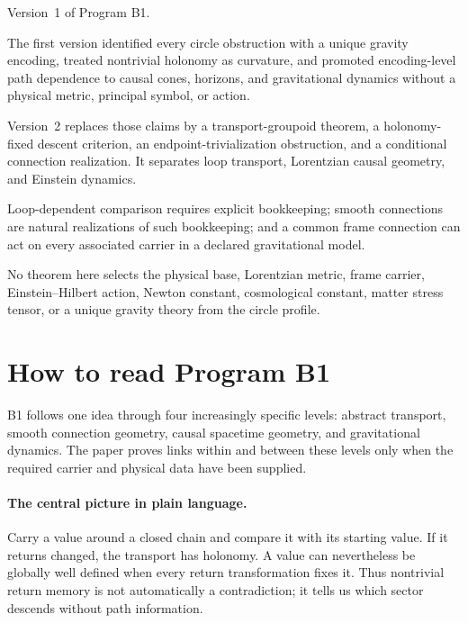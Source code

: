 \documentclass[11pt]{article}
\begin{document}
\begin{description}[leftmargin=2.5cm,style=nextline]
\item[Supersedes.]
Version~1 of Program B1.

\item[Reason.]
The first version identified every circle obstruction with a unique
gravity encoding, treated nontrivial holonomy as curvature, and promoted
encoding-level path dependence to causal cones, horizons, and gravitational
dynamics without a physical metric, principal symbol, or action.

\item[Resolution.]
Version~2 replaces those claims by a transport-groupoid theorem, a
holonomy-fixed descent criterion, an endpoint-trivialization obstruction, and
a conditional connection realization.  It separates loop transport,
Lorentzian causal geometry, and Einstein dynamics.

\item[Retained content.]
Loop-dependent comparison requires explicit bookkeeping; smooth connections
are natural realizations of such bookkeeping; and a common frame connection
can act on every associated carrier in a declared gravitational model.

\item[Open boundary.]
No theorem here selects the physical base, Lorentzian metric, frame carrier,
Einstein--Hilbert action, Newton constant, cosmological constant, matter
stress tensor, or a unique gravity theory from the circle profile.
\end{description}

\section*{How to read Program B1}
B1 follows one idea through four increasingly specific levels: abstract
transport, smooth connection geometry, causal spacetime geometry, and
gravitational dynamics.  The paper proves links within and between these
levels only when the required carrier and physical data have been supplied.

\paragraph{The central picture in plain language.}
Carry a value around a closed chain and compare it with its starting value.
If it returns changed, the transport has holonomy.  A value can nevertheless
be globally well defined when every return transformation fixes it.  Thus
nontrivial return memory is not automatically a contradiction; it tells us
which sector descends without path information.
\end{document}
